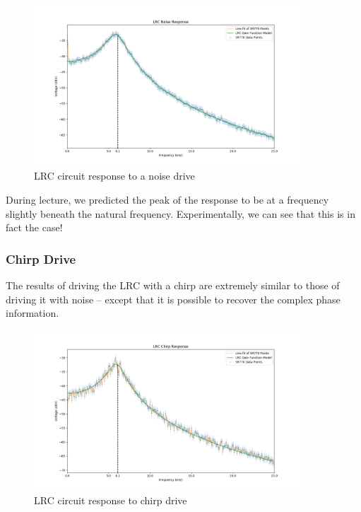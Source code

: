 \documentclass{article}
\begin{document}
\begin{figure}[H]
    \centering
\begin{minipage}{11cm}
\begin{tcolorbox}
    \centering
        \includegraphics[width=10cm, height=6cm]{figures/figure23.png}
        \caption{LRC circuit response to a noise drive}
        \label{fig:fig22}
\end{tcolorbox}
\end{minipage}
\end{figure}

During lecture, we predicted the peak of the response to be at a frequency
slightly beneath the natural frequency. Experimentally, we can see that this is
in fact the case!

\subsubsection{Chirp Drive}%
\label{ssub:chirp_drive}

The results of driving the LRC with a chirp are extremely similar to those of
driving it with noise -- except that it is possible to recover the complex
phase information.

\begin{figure}[H]
    \centering
\begin{minipage}{11cm}
\begin{tcolorbox}
    \centering
        \includegraphics[width=10cm, height=6cm]{figures/figure24.png}
        \caption{LRC circuit response to chirp drive}
        \label{fig:fig24}
\end{tcolorbox}
\end{minipage}
\end{figure}
\end{document}
